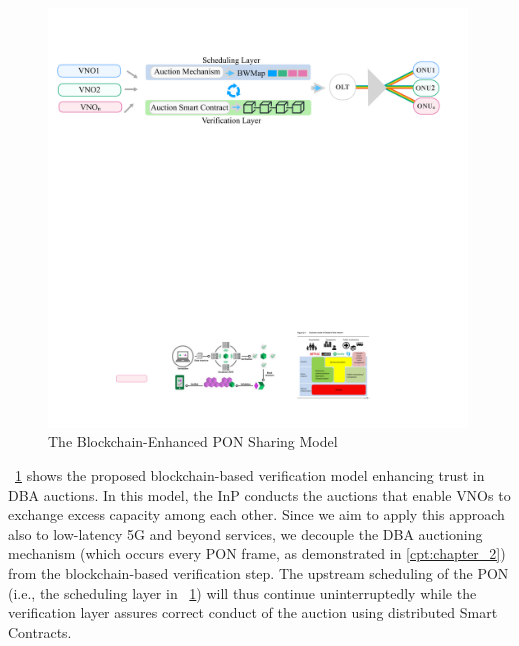 \begin{figure}%
  \centering
  \includegraphics[width=0.99\textwidth]{Figures/ICBC-model.pdf}
\caption{The Blockchain-Enhanced \ac{PON} Sharing Model }
\label{Fig_pon_bc_model}
\end{figure}
\figureautorefname~\ref{Fig_pon_bc_model} shows the proposed blockchain-based verification model enhancing trust in \ac{DBA} auctions. 
In this model, the \ac{InP} conducts the auctions that enable \acp{VNO} to exchange excess capacity among each other.
Since we aim to apply this approach also to low-latency \ac{5G} and beyond services, we decouple the \ac{DBA} auctioning mechanism (which occurs every \ac{PON} frame, as demonstrated in \autoref{cpt:chapter_2}) from the blockchain-based verification step. The upstream scheduling of the \ac{PON} (i.e., the scheduling layer in \figureautorefname~\ref{Fig_pon_bc_model}) will thus continue uninterruptedly while the verification layer assures correct conduct of the auction using distributed Smart Contracts. %
